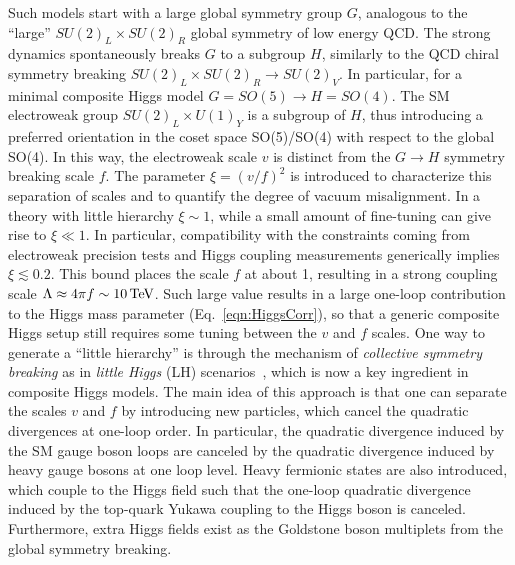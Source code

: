 Such models start with a large global symmetry group $G$, analogous to the ``large'' $SU(2)_L \times SU(2)_R$ global symmetry of low energy QCD.
The strong dynamics spontaneously breaks $G$ to a subgroup $H$, similarly to the QCD chiral symmetry breaking $SU(2)_L \times SU(2)_R \to SU(2)_V$.
In particular, for a minimal composite Higgs model $G = SO(5) \to H = SO(4)$.
The SM electroweak group $SU(2)_L \times U(1)_Y$ is a subgroup of $H$, thus introducing a preferred orientation in the coset space SO(5)/SO(4) with respect to the global SO(4).
In this way, the electroweak scale $v$ is distinct from the $G \to H$ symmetry breaking scale $f$. The parameter $\xi = (v/f)^2$ is introduced to characterize this separation of scales and to quantify the degree of vacuum misalignment.
In a theory with little hierarchy $\xi \sim 1$, while a small amount of fine-tuning can give rise to $\xi \ll 1$. In particular, compatibility with the constraints coming from electroweak precision tests and Higgs coupling measurements generically implies $\xi \lesssim 0.2$. This bound places the scale $f$ at about 1\TeV, resulting in a strong coupling scale $\Lambda \approx 4\pi f \sim 10\,\text{Te\hspace{-.08em}V}$.
Such large value results in a large one-loop contribution to the Higgs mass parameter (Eq.~\ref{eqn:HiggsCorr}), so that a generic composite Higgs setup still requires some tuning between the $v$ and $f$ scales.
One way to generate a ``little hierarchy'' is through the mechanism of \textit{collective symmetry breaking} as in \textit{little Higgs} (LH) scenarios~\cite{Han:2003wu,Perelstein:2005ka,Schmaltz:2005ky,Arkani:2002LH,Burdman:2002ns}, which is now a key ingredient in composite Higgs models.
The main idea of this approach is that one can separate the scales $v$ and $f$ by introducing new particles, which cancel the quadratic divergences at one-loop order. 
In particular, the quadratic divergence induced by the SM gauge boson loops are canceled by the quadratic divergence induced by heavy gauge bosons at one loop level.
Heavy fermionic states are also introduced, which couple to the Higgs field such that the one-loop quadratic divergence induced by the top-quark Yukawa coupling to the Higgs boson is canceled.
Furthermore, extra Higgs fields exist as the Goldstone boson multiplets from the global symmetry breaking.
